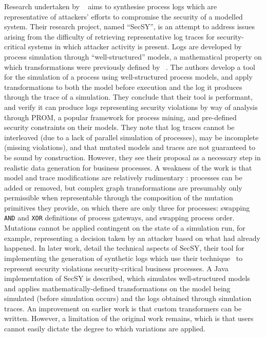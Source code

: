Research undertaken by \citeauthor{stocker2013secsy}~\cite{stocker2013secsy}
aims to synthesise process logs which are representative of attackers' efforts
to compromise the security of a modelled system. Their research project, named
``SecSY'', is an attempt to address issues arising from the difficulty of
retrieving representative log traces for security-critical systems in which
attacker activity is present. Logs are developed by process simulation through
``well-structured'' models, a mathematical property on which transformations
were previously defined by
\citeauthor{vanhatalo2009refined}~\cite{vanhatalo2009refined}. The authors
develop a tool for the simulation of a process using well-structured process
models, and apply transformations to both the model before execution and the log
it produces through the trace of a simulation. They conclude that their tool is
performant, and verify it can produce logs representing security violations by
way of analysis through PROM, a popular framework for process mining, and
pre-defined security constraints on their models. They note  that log traces
cannot be interleaved (due to a lack of parallel simulation of processes), may
be incomplete (missing violations), and that mutated models and traces are not
guaranteed to be sound by construction. However, they see their proposal as a
necessary step in realistic data generation for business processes. A  weakness
of the work is that model and trace modifications  are relatively rudimentary :
processes can be added or removed, but complex graph transformations are
presumably  only permissible when representable through the composition of the
mutation primitives they provide, on which there are only three for processes:
swapping \lstinline{AND} and \lstinline{XOR} definitions of process gateways, and swapping process
order. Mutations cannot be applied contingent on the state of a simulation run,
for example, representing a decision taken by an attacker based on what had
already happened. In later work, \citeauthor{stocker2014secsy} detail the
technical aspects of SecSY, their tool for implementing the generation of
synthetic logs which use their technique~\cite{stocker2013secsy} to represent
security violations  security-critical business processes. A Java implementation
of SecSY is described, which simulates well-structured models and applies
mathematically-defined transformations on the model being simulated (before
simulation occurs) and the logs obtained through simulation traces. An
improvement on earlier work is that custom transformers can be written. However,
a limitation of the original work remains, which is that users cannot easily
dictate the degree to which variations are applied.


